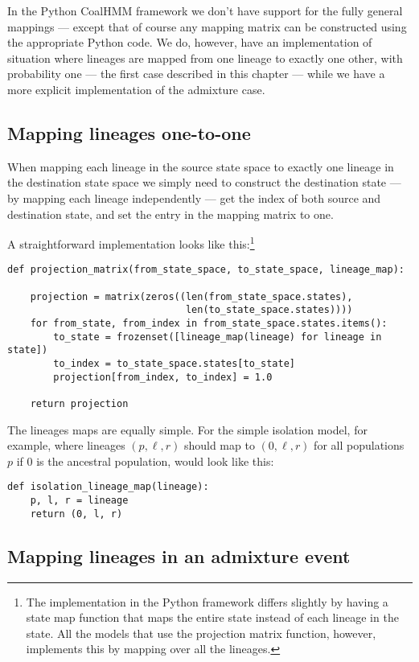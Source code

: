 In the Python CoalHMM framework we don't have support for the fully general mappings --- except that of course any mapping matrix can be constructed using the appropriate Python code. We do, however, have an implementation of situation where lineages are mapped from one lineage to exactly one other, with probability one --- the first case described in this chapter --- while we have a more explicit implementation of the admixture case.

\subsection{Mapping lineages one-to-one}

When mapping each lineage in the source state space to exactly one lineage in the destination state space we simply need to construct the destination state --- by mapping each lineage independently --- get the index of both source and destination state, and set the entry in the mapping matrix to one.

A straightforward implementation looks like this:\footnote{The implementation in the Python framework differs slightly by having a state map function that maps the entire state instead of each lineage in the state. All the models that use the projection matrix function, however, implements this by mapping over all the lineages.}
\begin{lstlisting}
def projection_matrix(from_state_space, to_state_space, lineage_map):

    projection = matrix(zeros((len(from_state_space.states),
                               len(to_state_space.states))))
    for from_state, from_index in from_state_space.states.items():
        to_state = frozenset([lineage_map(lineage) for lineage in state])
        to_index = to_state_space.states[to_state]
        projection[from_index, to_index] = 1.0

    return projection
\end{lstlisting}

The lineages maps are equally simple. For the simple isolation model, for example, where lineages $(p,\ell,r)$ should map to $(0,\ell,r)$ for all populations $p$ if $0$ is the ancestral population, would look like this:
\begin{lstlisting}
def isolation_lineage_map(lineage):
    p, l, r = lineage
    return (0, l, r)
\end{lstlisting}

\subsection{Mapping lineages in an admixture event}

